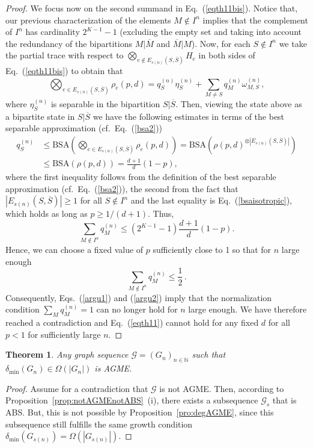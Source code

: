 \documentclass[a4paper,onecolumn,accepted=2024-12-14]{quantumarticle}
\newtheorem{theorem}{Theorem}[section]%
\theoremstyle{plain}
\newcommand{\cG}{{\mathcal G}}         %
\newcommand{\N}{\mathbb{N}} %
\begin{document}
\begin{proof}
We focus now on the second summand in Eq.~(\ref{eqth11bis}). Notice that, our previous characterization of the elements $M\notin I^n$ implies that the complement of $I^n$ has cardinality $2^{K-1}-1$ (excluding the empty set and taking into account the redundancy of the bipartitions
$M|\overline{M}$ and $\overline{M}|M$).
Now, for each $S\notin I^n$ we take the partial trace with respect to $\bigotimes_{e\notin E_{s(n)}(S,\overline{S})}H_e$ in both sides of Eq.~(\ref{eqth11bis}) to obtain that
\begin{equation}
\bigotimes_{e\in E_{s(n)}(S,\overline{S})}\rho_{e}(p,d)=q_S^{(n)}\eta_S^{(n)}+\sum_{M\neq S}q_M^{(n)}\omega_{M,S}^{(n)},
\end{equation}
where $\eta_S^{(n)}$ is separable in the bipartition $S|\overline{S}$. Then, viewing the state above as a bipartite state in $S|\overline{S}$
we have the following estimates in terms of the best separable approximation
(cf.\ Eq.~(\ref{bsa2}))
\begin{align}
q_S^{(n)}&\leq \mathrm{BSA}\left(\bigotimes_{e\in E_{s(n)}(S,\overline{S})}\rho_{e}(p,d)\right)
=\mathrm{BSA}\left(\rho(p,d)^{\otimes |E_{s(n)}(S,\overline{S})|}\right)\nonumber\\&\leq \mathrm{BSA}(\rho(p,d))
=\frac{d+1}{d}(1-p),
\end{align}
where the first inequality follows from the definition of the best separable approximation (cf.~Eq.~(\ref{bsa2})), the second from the fact that $|E_{s(n)}(S,\overline{S})|\geq 1$ for all $S\notin I^n$ and the last equality is Eq.~(\ref{bsaisotropic}), which holds as long as $p\geq1/(d+1)$. Thus,
\begin{equation}
\sum_{M\notin I^n}q_M^{(n)}\leq\left(2^{K-1}-1\right)\frac{d+1}{d}(1-p).
\end{equation}
Hence, we can choose a fixed value of $p$ sufficiently close to 1 so that for $n$ large enough
\begin{equation}\label{argu2}
\sum_{M\notin I^n}q_M^{(n)}\leq \frac{1}{2}\,.
\end{equation}
Consequently, Eqs.~(\ref{argu1}) and (\ref{argu2}) imply that the normalization
condition $\sum_Mq_M^{(n)}=1$ can no longer hold for $n$ large enough. We have therefore reached a contradiction and Eq.~(\ref{eqth11}) cannot hold for any fixed $d$ for all $p<1$ for sufficiently large $n$.
\end{proof}



\begin{theorem}\label{th:degAGME}
Any graph sequence $\cG=(G_n)_{n\in\N}$ such that $\delta_{\mathrm{min}}(G_n)\in\Omega(|G_n|)$ is AGME.
\end{theorem}
\begin{proof}
Assume for a contradiction that $\cG$ is not AGME. Then, according to Proposition~\ref{prop:notAGMEnotABS}~(i), there  exists a subsequence $\cG_s$ that is ABS. But, this is not possible by Proposition~\ref{pro:degAGME}, since  this subsequence still fulfills the same growth condition $\delta_{\mathrm{min}}(G_{s(n)})=\Omega(|G_{s(n)}|)$.
\end{proof}
\end{document}
